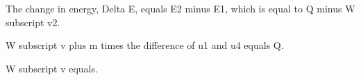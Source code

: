The change in energy, Delta E, equals E2 minus E1, which is equal to Q minus W subscript v2.

W subscript v plus m times the difference of u1 and u4 equals Q.

W subscript v equals.